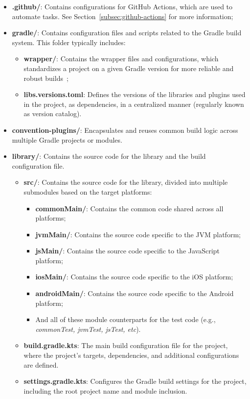 \begin{itemize}
    \item \textbf{.github/}: Contains configurations for GitHub Actions, which are used to automate tasks. See Section~\ref{subsec:github-actions} for more information;
    \item \textbf{gradle/}: Contains configuration files and scripts related to the Gradle build system.
    This folder typically includes:
    \begin{itemize}
        \item \textbf{wrapper/}: Contains the wrapper files and configurations, which standardizes a project on a given Gradle version for more reliable and robust builds~\cite{gradle-wrapper};
        \item \textbf{libs.versions.toml}: Defines the versions of the libraries and plugins used in the project, as dependencies, in a centralized manner (regularly known as version catalog).
    \end{itemize}
    \item \textbf{convention-plugins/}: Encapsulates and reuses common build logic across multiple Gradle projects or modules.
    \item \textbf{library/}: Contains the source code for the library and the build configuration file.
    \begin{itemize}
        \item \textbf{src/}: Contains the source code for the library, divided into multiple submodules based on the target platforms:
        \begin{itemize}
            \item \textbf{commonMain/}: Contains the common code shared across all platforms;
            \item \textbf{jvmMain/}: Contains the source code specific to the JVM platform;
            \item \textbf{jsMain/}: Contains the source code specific to the JavaScript platform;
            \item \textbf{iosMain/}: Contains the source code specific to the iOS platform;
            \item \textbf{androidMain/}: Contains the source code specific to the Android platform;
            \item And all of these module counterparts for the test code (e.g., \textit{commonTest, jvmTest, jsTest, etc}).
        \end{itemize}
        \item \textbf{build.gradle.kts}: The main build configuration file for the project, where the project's targets, dependencies, and additional configurations are defined.
        \item \textbf{settings.gradle.kts}: Configures the Gradle build settings for the project, including the root project name and module inclusion.
    \end{itemize}
\end{itemize}

